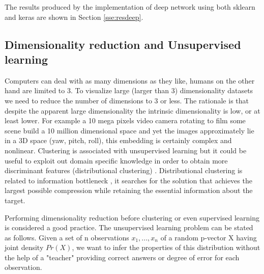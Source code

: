 \documentclass[11pt]{article}
\theoremstyle{definition}
\theoremstyle{remark}
\begin{document}
{The results produced by the implementation of deep network using both sklearn and keras are shown in Section \ref{sse:resdeep}.


\subsection{Dimensionality reduction and Unsupervised learning}

Computers can deal with as many dimensions as they like, humans on the other hand are limited to 3. To visualize large (larger than 3) dimensionality datasets we need to reduce the number of dimensions to 3 or less. The rationale is that despite the apparent large dimensionality the intrinsic dimensionality is low, or at least lower. For example a 10 mega pixels video camera rotating to film some scene build a 10 million dimensional space and yet the images approximately lie in a 3D space (yaw, pitch, roll), this embedding is certainly complex and nonlinear.
Clustering is associated with unsupervised learning but it could be useful to exploit out domain specific knowledge in order to obtain more discriminant features (distributional clustering) \cite{guyon2003introduction}. Distributional clustering is related to information bottleneck \cite{tishby2015deep}, it searches for the solution that achieves the largest possible compression while retaining the essential information about the target.

Performing dimensionality reduction before clustering or even supervised learning is considered a good practice. The unsupervised learning problem can be stated as follows. Given a set of n observations $x_1, ..., x_n$ of a random p-vector X having joint density $Pr(X)$, we want to infer the properties of this distribution without the help of a "teacher" providing correct answers or degree of error for each observation. %

}
\end{document}
